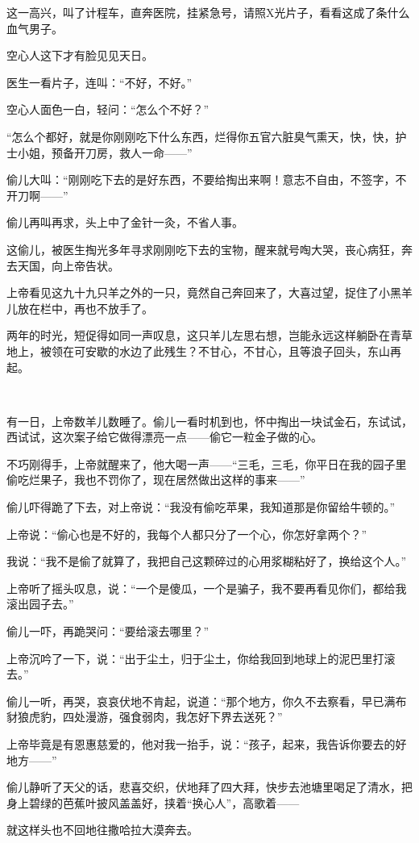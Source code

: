 \par 这一高兴，叫了计程车，直奔医院，挂紧急号，请照X光片子，看看这成了条什么血气男子。
\par 空心人这下才有脸见见天日。
\par 医生一看片子，连叫：“不好，不好。”
\par 空心人面色一白，轻问：“怎么个不好？”
\par “怎么个都好，就是你刚刚吃下什么东西，烂得你五官六脏臭气熏天，快，快，护士小姐，预备开刀房，救人一命——”
\par 偷儿大叫：“刚刚吃下去的是好东西，不要给掏出来啊！意志不自由，不签字，不开刀啊——”
\par 偷儿再叫再求，头上中了金针一灸，不省人事。
\par 这偷儿，被医生掏光多年寻求刚刚吃下去的宝物，醒来就号啕大哭，丧心病狂，奔去天国，向上帝告状。
\par 上帝看见这九十九只羊之外的一只，竟然自己奔回来了，大喜过望，捉住了小黑羊儿放在栏中，再也不放手了。
\par 两年的时光，短促得如同一声叹息，这只羊儿左思右想，岂能永远这样躺卧在青草地上，被领在可安歇的水边了此残生？不甘心，不甘心，且等浪子回头，东山再起。
\par  
\par 有一日，上帝数羊儿数睡了。偷儿一看时机到也，怀中掏出一块试金石，东试试，西试试，这次案子给它做得漂亮一点——偷它一粒金子做的心。
\par 不巧刚得手，上帝就醒来了，他大喝一声——“三毛，三毛，你平日在我的园子里偷吃烂果子，我也不罚你了，现在居然做出这样的事来——”
\par 偷儿吓得跪了下去，对上帝说：“我没有偷吃苹果，我知道那是你留给牛顿的。”
\par 上帝说：“偷心也是不好的，我每个人都只分了一个心，你怎好拿两个？”
\par 我说：“我不是偷了就算了，我把自己这颗碎过的心用浆糊粘好了，换给这个人。”
\par 上帝听了摇头叹息，说：“一个是傻瓜，一个是骗子，我不要再看见你们，都给我滚出园子去。”
\par 偷儿一吓，再跪哭问：“要给滚去哪里？”
\par 上帝沉吟了一下，说：“出于尘土，归于尘土，你给我回到地球上的泥巴里打滚去。”
\par 偷儿一听，再哭，哀哀伏地不肯起，说道：“那个地方，你久不去察看，早已满布豺狼虎豹，四处漫游，强食弱肉，我怎好下界去送死？”
\par 上帝毕竟是有恩惠慈爱的，他对我一抬手，说：“孩子，起来，我告诉你要去的好地方——”
\par 偷儿静听了天父的话，悲喜交织，伏地拜了四大拜，快步去池塘里喝足了清水，把身上碧绿的芭蕉叶披风盖盖好，挟着“换心人”，高歌着——
\par 就这样头也不回地往撒哈拉大漠奔去。


